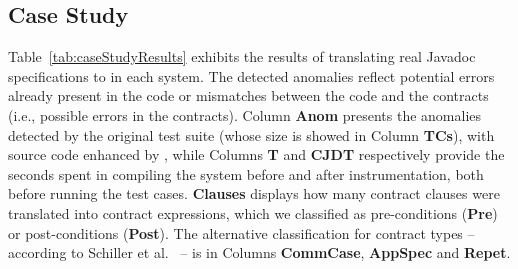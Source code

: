 

\subsection{Case Study}

Table~\ref{tab:caseStudyResults} exhibits the results of translating real Javadoc specifications to \contractjdoc{} in each system.
The detected anomalies reflect potential errors already present in the code or mismatches between the code and the contracts (i.e., possible errors in the contracts).
Column \textbf{Anom} presents the anomalies detected by the original test suite (whose size is showed in Column \textbf{TCs}), with source code enhanced by \contractjdoc{}, while Columns \textbf{T} and \textbf{CJDT} respectively provide the seconds spent in compiling the system before and after \contractjdoc{} instrumentation, both before running the test cases. 
\textbf{Clauses} displays how many contract clauses were translated into contract expressions, which we classified as pre-conditions (\textbf{Pre}) or post-conditions (\textbf{Post}). The alternative classification for contract types -- according to Schiller et al.~\cite{typeContracts} -- is in Columns \textbf{CommCase}, \textbf{AppSpec} and \textbf{Repet}.

